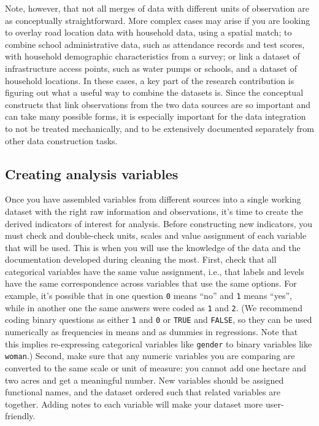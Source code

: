 Note, however, that not all merges of data with different units of observation 
are as conceptually straightforward.
More complex cases may arise if you are looking to overlay road location data with household data,
using a spatial match;
to combine school administrative data, such as attendance records and test scores,
with household demographic characteristics from a survey;
or link a dataset of infrastructure access points, such as water pumps or schools,
and a dataset of household locations.
In these cases, a key part of the research contribution is figuring out what
a useful way to combine the datasets is.
Since the conceptual constructs that link observations from the two data sources
are so important and can take many possible forms,
it is especially important for the data integration to not be treated mechanically,
and to be extensively documented separately from other data construction tasks.


\subsection{Creating analysis variables}

Once you have assembled variables from different sources into a single working dataset
with the right raw information and observations,
it's time to create the derived indicators of interest for analysis. 
Before constructing new indicators,
you must check and double-check units, scales and value assignment of each variable that will be used.
This is when you will use the knowledge of the data and the documentation developed during cleaning the most.
First, check that all categorical variables have the same value assignment, i.e.,
that labels and levels have the same correspondence across variables that use the same options.
For example, it's possible that in one question \texttt{0} means ``no'' and \texttt{1} means ``yes'',
while in another one the same answers were coded as \texttt{1} and \texttt{2}.
(We recommend coding binary questions as either \texttt{1} and \texttt{0} or \texttt{TRUE} and \texttt{FALSE},
so they can be used numerically as frequencies in means and as dummies in regressions.
Note that this implies re-expressing categorical variables like \texttt{gender} to binary variables like \texttt{woman}.)
Second, make sure that any numeric variables you are comparing are converted to the same scale or unit of measure:
you cannot add one hectare and two acres and get a meaningful number.
New variables should be assigned functional names, 
and the dataset ordered such that related variables are together.
Adding notes to each variable will make your dataset more user-friendly.

